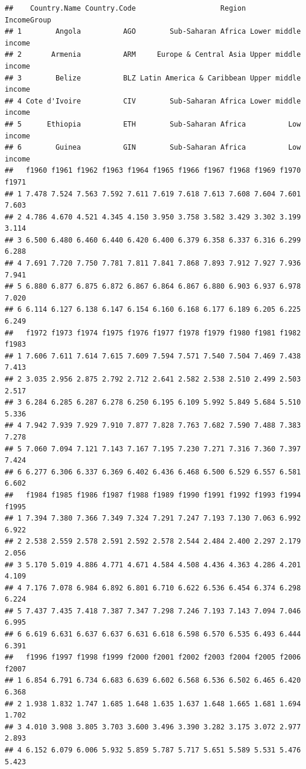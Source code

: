 \documentclass[]{book}
\begin{document}
\begin{verbatim}
##    Country.Name Country.Code                    Region         IncomeGroup
## 1        Angola          AGO        Sub-Saharan Africa Lower middle income
## 2       Armenia          ARM     Europe & Central Asia Upper middle income
## 3        Belize          BLZ Latin America & Caribbean Upper middle income
## 4 Cote d'Ivoire          CIV        Sub-Saharan Africa Lower middle income
## 5      Ethiopia          ETH        Sub-Saharan Africa          Low income
## 6        Guinea          GIN        Sub-Saharan Africa          Low income
##   f1960 f1961 f1962 f1963 f1964 f1965 f1966 f1967 f1968 f1969 f1970 f1971
## 1 7.478 7.524 7.563 7.592 7.611 7.619 7.618 7.613 7.608 7.604 7.601 7.603
## 2 4.786 4.670 4.521 4.345 4.150 3.950 3.758 3.582 3.429 3.302 3.199 3.114
## 3 6.500 6.480 6.460 6.440 6.420 6.400 6.379 6.358 6.337 6.316 6.299 6.288
## 4 7.691 7.720 7.750 7.781 7.811 7.841 7.868 7.893 7.912 7.927 7.936 7.941
## 5 6.880 6.877 6.875 6.872 6.867 6.864 6.867 6.880 6.903 6.937 6.978 7.020
## 6 6.114 6.127 6.138 6.147 6.154 6.160 6.168 6.177 6.189 6.205 6.225 6.249
##   f1972 f1973 f1974 f1975 f1976 f1977 f1978 f1979 f1980 f1981 f1982 f1983
## 1 7.606 7.611 7.614 7.615 7.609 7.594 7.571 7.540 7.504 7.469 7.438 7.413
## 2 3.035 2.956 2.875 2.792 2.712 2.641 2.582 2.538 2.510 2.499 2.503 2.517
## 3 6.284 6.285 6.287 6.278 6.250 6.195 6.109 5.992 5.849 5.684 5.510 5.336
## 4 7.942 7.939 7.929 7.910 7.877 7.828 7.763 7.682 7.590 7.488 7.383 7.278
## 5 7.060 7.094 7.121 7.143 7.167 7.195 7.230 7.271 7.316 7.360 7.397 7.424
## 6 6.277 6.306 6.337 6.369 6.402 6.436 6.468 6.500 6.529 6.557 6.581 6.602
##   f1984 f1985 f1986 f1987 f1988 f1989 f1990 f1991 f1992 f1993 f1994 f1995
## 1 7.394 7.380 7.366 7.349 7.324 7.291 7.247 7.193 7.130 7.063 6.992 6.922
## 2 2.538 2.559 2.578 2.591 2.592 2.578 2.544 2.484 2.400 2.297 2.179 2.056
## 3 5.170 5.019 4.886 4.771 4.671 4.584 4.508 4.436 4.363 4.286 4.201 4.109
## 4 7.176 7.078 6.984 6.892 6.801 6.710 6.622 6.536 6.454 6.374 6.298 6.224
## 5 7.437 7.435 7.418 7.387 7.347 7.298 7.246 7.193 7.143 7.094 7.046 6.995
## 6 6.619 6.631 6.637 6.637 6.631 6.618 6.598 6.570 6.535 6.493 6.444 6.391
##   f1996 f1997 f1998 f1999 f2000 f2001 f2002 f2003 f2004 f2005 f2006 f2007
## 1 6.854 6.791 6.734 6.683 6.639 6.602 6.568 6.536 6.502 6.465 6.420 6.368
## 2 1.938 1.832 1.747 1.685 1.648 1.635 1.637 1.648 1.665 1.681 1.694 1.702
## 3 4.010 3.908 3.805 3.703 3.600 3.496 3.390 3.282 3.175 3.072 2.977 2.893
## 4 6.152 6.079 6.006 5.932 5.859 5.787 5.717 5.651 5.589 5.531 5.476 5.423

\end{verbatim}
\end{document}

